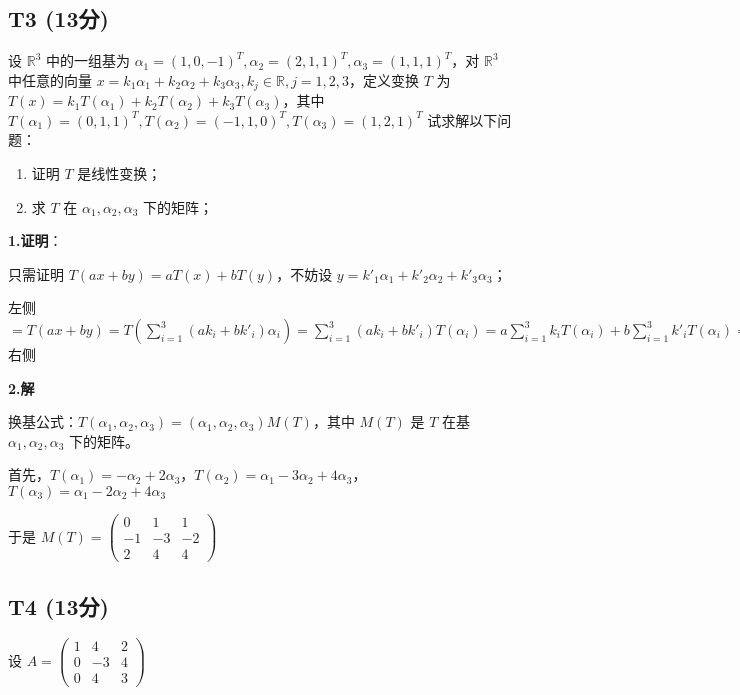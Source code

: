 \documentclass{article}
\begin{document}
\subsection{T3 (13分)}

\par 设 $\mathbb R^3$ 中的一组基为 $\alpha_1=(1, 0, -1)^T, \alpha_2=(2, 1, 1)^T, \alpha_3=(1, 1, 1)^T$，对 $\mathbb R^3$ 中任意的向量 $x=k_1\alpha_1 + k_2\alpha_2+k_3\alpha_3, k_j\in\mathbb R, j=1, 2, 3$，定义变换 $T$ 为 $T(x)=k_1T(\alpha_1)+k_2T(\alpha_2)+k_3T(\alpha_3)$，其中 $T(\alpha_1)=(0, 1, 1)^T, T(\alpha_2)=(-1, 1, 0)^T, T(\alpha_3)=(1, 2, 1)^T$ 试求解以下问题：

\begin{enumerate}
	\item 证明 $T$ 是线性变换；
	\item 求 $T$ 在 $\alpha_1, \alpha_2, \alpha_3$ 下的矩阵；
\end{enumerate}

\par \textbf{1.证明}：

只需证明 $T(ax + by)=aT(x)+bT(y)$，不妨设 $y=k'_1\alpha_1+k'_2\alpha_2+k'_3\alpha_3$；

左侧 $=T(ax+by)=T(\sum_{i=1}^3(ak_i + bk'_i)\alpha_i)=\sum_{i=1}^3(ak_i + bk'_i)T(\alpha_i)=a\sum_{i=1}^3k_iT(\alpha_i)+b\sum_{i=1}^3 k'_iT(\alpha_i)=$ 右侧

\par \textbf{2.解}

换基公式：$T(\alpha_1, \alpha_2, \alpha_3)=(\alpha_1, \alpha_2, \alpha_3) M(T)$，其中 $M(T)$ 是 $T$ 在基 $\alpha_1, \alpha_2, \alpha_3$ 下的矩阵。

首先，$T(\alpha_1)=-\alpha_2+2\alpha_3$，$T(\alpha_2)=\alpha_1-3\alpha_2+4\alpha_3$， $T(\alpha_3)=\alpha_1-2\alpha_2+4\alpha_3$

于是 $M(T)=\begin{pmatrix}
	0 & 1 & 1\\
	-1 & -3 & -2\\
	2 & 4 & 4
\end{pmatrix}$

\subsection{T4 (13分)}

\par 设 $A=\begin{pmatrix}
	1 & 4 & 2\\
	0 & -3 & 4\\
	0 & 4 & 3
\end{pmatrix}$
\end{document}

